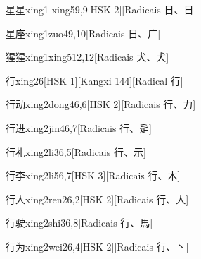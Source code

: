 \begin{entry}{星星}{xing1 xing5}{9,9}[HSK 2][Radicais ⽇、⽇]
\end{entry}

\begin{entry}{星座}{xing1zuo4}{9,10}[Radicais ⽇、⼴]
\end{entry}

\begin{entry}{猩猩}{xing1xing5}{12,12}[Radicais ⽝、⽝]
\end{entry}

\begin{entry}{行}{xing2}{6}[HSK 1][Kangxi 144][Radical ⾏]
\end{entry}

\begin{entry}{行动}{xing2dong4}{6,6}[HSK 2][Radicais ⾏、⼒]
\end{entry}

\begin{entry}{行进}{xing2jin4}{6,7}[Radicais ⾏、⾡]
\end{entry}

\begin{entry}{行礼}{xing2li3}{6,5}[Radicais ⾏、⽰]
\end{entry}

\begin{entry}{行李}{xing2li5}{6,7}[HSK 3][Radicais ⾏、⽊]
\end{entry}

\begin{entry}{行人}{xing2ren2}{6,2}[HSK 2][Radicais ⾏、⼈]
\end{entry}

\begin{entry}{行驶}{xing2shi3}{6,8}[Radicais ⾏、⾺]
\end{entry}

\begin{entry}{行为}{xing2wei2}{6,4}[HSK 2][Radicais ⾏、⼂]
\end{entry}

